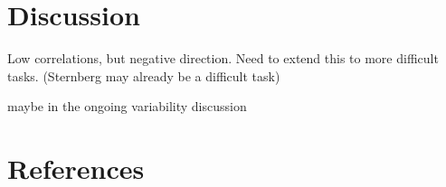 \documentclass[
  man,floatsintext]{apa7}
\newlength{\cslhangindent}
\newlength{\cslentryspacingunit} %
\newenvironment{CSLReferences}[2] %
 {%
  \setlength{\parindent}{0pt}
  \ifodd #1
  \let\oldpar\par
  \def\par{\hangindent=\cslhangindent\oldpar}
  \fi
  \setlength{\parskip}{#2\cslentryspacingunit}
 }%
 {}
\begin{document}
\hypertarget{discussion}{%
\section{Discussion}\label{discussion}}

Low correlations, but negative direction. Need to extend this to more difficult tasks. (Sternberg may already be a difficult task)

maybe in the ongoing variability discussion

\newpage

\hypertarget{references}{%
\section{References}\label{references}}

\hypertarget{refs}{}
\begin{CSLReferences}{0}{0}
\end{CSLReferences}
\end{document}
